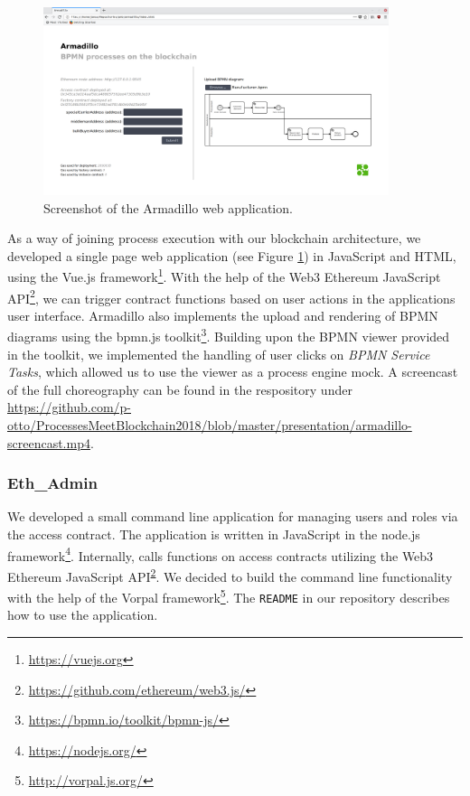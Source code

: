 \documentclass[runningheads]{llncs}
\begin{document}
\begin{figure}
	\centering
\includegraphics[width=0.9\textwidth]{fig/Armadillo.png}
\caption{Screenshot of the Armadillo web application.}
\label{fig:armadillo}
\end{figure}

As a way of joining process execution with our blockchain architecture, we developed a single page web application (see Figure \ref{fig:armadillo}) in JavaScript and HTML, using the Vue.js framework\footnote{\url{https://vuejs.org}}.
With the help of the Web3 Ethereum JavaScript API\footnote{\label{web3}\url{https://github.com/ethereum/web3.js/}}, we can trigger contract functions based on user actions in the applications user interface.
Armadillo also implements the upload and rendering of BPMN diagrams using the bpmn.js toolkit\footnote{\url{https://bpmn.io/toolkit/bpmn-js/}}.
Building upon the BPMN viewer provided in the toolkit, we implemented the handling of user clicks on \emph{BPMN Service Tasks}, which allowed us to use the viewer as a process engine mock.
A screencast of the full choreography can be found in the respository under \url{https://github.com/p-otto/ProcessesMeetBlockchain2018/blob/master/presentation/armadillo-screencast.mp4}.

\subsubsection{Eth\_Admin}

We developed a small command line application for managing users and roles via the access contract.
The application is written in JavaScript in the node.js framework\footnote{\url{https://nodejs.org/}}.
Internally, calls functions on access contracts utilizing the Web3 Ethereum JavaScript API\textsuperscript{\ref{web3}}.
We decided to build the command line functionality with the help of the Vorpal framework\footnote{\url{http://vorpal.js.org/}}.
The \texttt{README} in our repository describes how to use the application.
\end{document}
